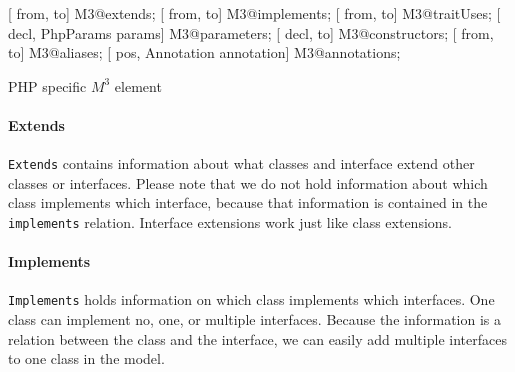 \documentclass[../main.tex]{subfiles}
\begin{document}
    \begin{program}    
    \begin{rascal}%
 [ from,  to] M3@extends;    
 [ from,  to] M3@implements; 
 [ from,  to] M3@traitUses;  
 [ decl, PhpParams params] M3@parameters; 
 [ decl,  to] M3@constructors; 
 [ from,  to] M3@aliases;      
 [ pos, Annotation annotation] M3@annotations; \end{rascal}%
	
	\caption{PHP specific $M^3$ element}
	\label{fig:m3_php_elements}
	\end{program}
	    
	\paragraph{Extends} \texttt{Extends} contains information about what classes and interface extend other classes or interfaces.
	Please note that we do not hold information about which class implements which interface, because that information is contained in the \texttt{implements} relation.
    Interface extensions work just like class extensions.
    
    \paragraph{Implements} \texttt{Implements} holds information on which class implements which interfaces.
    One class can implement no, one, or multiple interfaces.
    Because the information is a relation between the class and the interface, we can easily add multiple interfaces to one class in the model.
    
\end{document}
